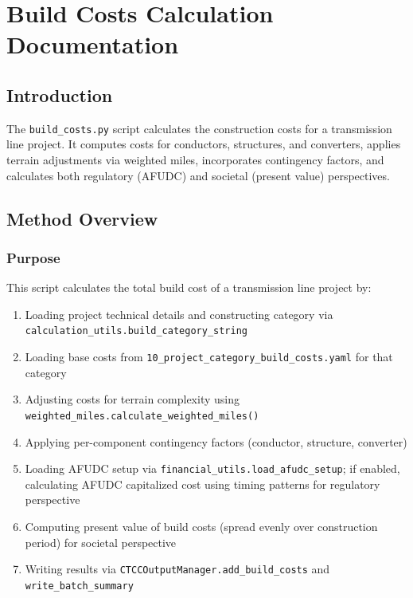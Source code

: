 \documentclass[ctcc_full_documentation.tex]{subfiles}
\begin{document}
\chapter{Build Costs Calculation Documentation}

\section{Introduction}

The \texttt{build\_costs.py} script calculates the construction costs for a transmission line project. It computes costs for conductors, structures, and converters, applies terrain adjustments via weighted miles, incorporates contingency factors, and calculates both regulatory (AFUDC) and societal (present value) perspectives.

\section{Method Overview}

\subsection{Purpose}

This script calculates the total build cost of a transmission line project by:
\begin{enumerate}
    \item Loading project technical details and constructing category via \texttt{calculation\_utils.build\_category\_string}
    \item Loading base costs from \texttt{10\_project\_category\_build\_costs.yaml} for that category
    \item Adjusting costs for terrain complexity using \texttt{weighted\_miles.calculate\_weighted\_miles()}
    \item Applying per-component contingency factors (conductor, structure, converter)
    \item Loading AFUDC setup via \texttt{financial\_utils.load\_afudc\_setup}; if enabled, calculating AFUDC capitalized cost using timing patterns for regulatory perspective
    \item Computing present value of build costs (spread evenly over construction period) for societal perspective
    \item Writing results via \texttt{CTCCOutputManager.add\_build\_costs} and \texttt{write\_batch\_summary}
\end{enumerate}
\end{document}
